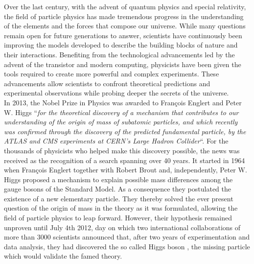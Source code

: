 Over the last century, with the advent of quantum physics and special relativity, the field of particle physics has made tremendous progress in the understanding of the elements and the forces that compose our universe. While many questions remain open for future generations to answer, scientists have continuously been improving the models developed to describe the building blocks of nature and their interactions. Benefiting from the technological advancements led by the advent of the transistor and modern computing, physicists have been given the tools required to create more powerful and complex experiments. These advancements allow scientists to confront theoretical predictions and experimental observations while probing deeper the secrets of the universe. \\

In 2013, the Nobel Prize in Physics was awarded to Fran\c{c}ois Englert and Peter W. Higgs ``\textit{for the theoretical discovery of a mechanism that contributes to our understanding of the origin of mass of subatomic particles, and which recently was confirmed through the discovery of the predicted fundamental particle, by the ATLAS and CMS experiments at CERN's Large Hadron Collider}``. For the thousands of physicists who helped make this discovery possible, the news was received as the recognition of a search spanning over 40 years. It started in 1964 when Fran\c{c}ois Englert together with Robert Brout \cite{PhysRevLett.13.321} and, independently, Peter W. Higgs \cite{PhysRevLett.13.508} proposed a mechanism to explain possible mass differences among the gauge bosons of the Standard Model. As a consequence they postulated the existence of a new elementary particle. They thereby solved the ever present question of the origin of mass in the theory as it was formulated, allowing the field of particle physics to leap forward. However, their hypothesis remained unproven until July 4th 2012, day on which two international collaborations of more than 3000 scientists announced that, after two years of experimentation and data analysis, they had discovered the so called Higgs boson \cite{PhysRevLett.114.191803}, the missing particle which would validate the famed theory. \\


